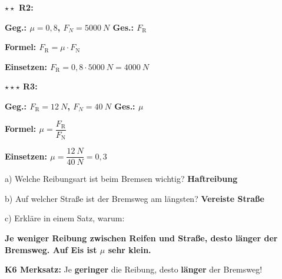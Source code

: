 \documentclass[11pt,a4paper]{article}
\newcommand{\lsg}[1]{\textcolor{loesung}{\textbf{#1}}}
\newcommand{\stern}[1]{\textcolor{merkerand}{\textbf{#1}}}
\begin{document}
\vspace{0.4em}

\textbf{\stern{$\star\star$} R2:}

\lsg{Geg.: $\mu = 0{,}8$, $F_N = \SI{5000}{N}$ \quad Ges.: $F_\text{R}$}

\lsg{Formel: $F_\text{R} = \mu \cdot F_\text{N}$}

\lsg{Einsetzen: $F_\text{R} = 0{,}8 \cdot \SI{5000}{N} = \SI{4000}{N}$}

\vspace{0.4em}

\textbf{\stern{$\star\star\star$} R3:}

\lsg{Geg.: $F_\text{R} = \SI{12}{N}$, $F_N = \SI{40}{N}$ \quad Ges.: $\mu$}

\lsg{Formel: $\mu = \dfrac{F_\text{R}}{F_\text{N}}$}

\lsg{Einsetzen: $\mu = \dfrac{\SI{12}{N}}{\SI{40}{N}} = 0{,}3$}

\vspace{0.4em}

\begin{protokollbox}[title=A2: Anwendung -- Bremsweg]
\small
a) Welche Reibungsart ist beim Bremsen wichtig? \lsg{Haftreibung}

\vspace{0.2em}
b) Auf welcher Straße ist der Bremsweg am längsten? \lsg{Vereiste Straße}

\vspace{0.2em}
c) Erkläre in einem Satz, warum:

\lsg{Je weniger Reibung zwischen Reifen und Straße, desto länger der Bremsweg. Auf Eis ist $\mu$ sehr klein.}

\vspace{0.2em}
\textbf{K6 Merksatz:} Je \lsg{geringer} die Reibung, desto \lsg{länger} der Bremsweg!
\end{protokollbox}
\end{document}
